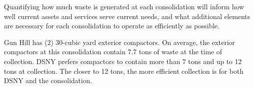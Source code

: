 
    Quantifying how much waste is generated at each consolidation will inform how well current assets and services serve current needs, and what additional elements are necessary for each consolidation to operate as efficiently as possible.
    
    Gun Hill has (2) 30-cubic yard exterior compactors. On average, the exterior compactors at this consolidation contain 7.7 tons of waste at the time of collection. DSNY prefers compactors to contain more than 7 tons and up to 12 tons at collection. The closer to 12 tons, the more efficient collection is for both DSNY and the consolidation.